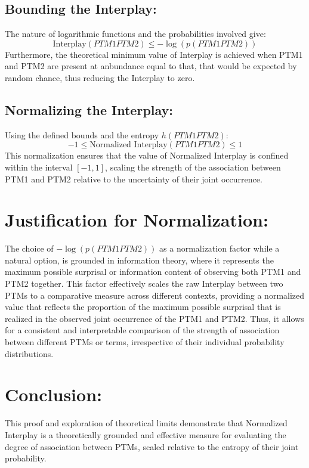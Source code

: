 \documentclass{article}
\begin{document}
\subsection*{Bounding the Interplay:}
The nature of logarithmic functions and the probabilities involved give:
\[
\text{Interplay}(PTM1  PTM2) \leq -\log(p(PTM1  PTM2))
\]
Furthermore, the theoretical minimum value of Interplay is achieved when PTM1 and PTM2 are present at anbundance equal to that, that would be expected by random chance, thus reducing the Interplay to zero.

\subsection*{Normalizing the Interplay:}
Using the defined bounds and the entropy \( h(PTM1  PTM2) \):
\[
-1 \leq \text{Normalized Interplay}(PTM1 PTM2) \leq 1
\]
This normalization ensures that the value of Normalized Interplay is confined within the interval \([-1, 1]\), scaling the strength of the association between PTM1 and PTM2 relative to the uncertainty of their joint occurrence.

\section*{Justification for Normalization:}
The choice of \(-\log(p(PTM1  PTM2))\) as a normalization factor while a natural option, is grounded in information theory, where it represents the maximum possible surprisal or information content of observing both PTM1 and PTM2 together. This factor effectively scales the raw Interplay between two PTMs to a comparative measure across different contexts, providing a normalized value that reflects the proportion of the maximum possible surprisal that is realized in the observed joint occurrence of the PTM1 and PTM2. Thus, it allows for a consistent and interpretable comparison of the strength of association between different PTMs or terms, irrespective of their individual probability distributions.

\section*{Conclusion:}
This proof and exploration of theoretical limits demonstrate that Normalized Interplay is a theoretically grounded and effective measure for evaluating the degree of association between PTMs, scaled relative to the entropy of their joint probability.
\end{document}

